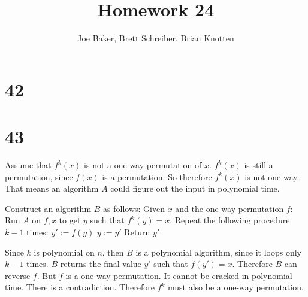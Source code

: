 \documentclass[letterpaper,notitlepage,twoside]{article}
\begin{document}
\title{Homework 24}
\author{Joe Baker, Brett Schreiber, Brian Knotten}
\maketitle
\section*{42}

\section*{43}
Assume that $f^k(x)$ is not a one-way permutation of $x$. $f^k(x)$ is still a permutation, since $f(x)$ is a permutation. So therefore $f^k(x)$ is not one-way. That means an algorithm $A$ could figure out the input in polynomial time.

Construct an algorithm $B$ as follows:
Given $x$ and the one-way permutation $f$:
\tab Run $A$ on $f, x$ to get $y$ such that $f^k(y) = x$.
\tab Repeat the following procedure $k - 1$ times:
\tab\tab $y' := f(y)$
\tab\tab $y := y'$
\tab Return $y'$

Since $k$ is polynomial on $n$, then $B$ is a polynomial algorithm, since it loops only $k - 1$ times. $B$ returns the final value $y'$ such that $f(y') = x$. Therefore $B$ can reverse $f$. But $f$ is a one way permutation. It cannot be cracked in polynomial time. There is a contradiction. Therefore $f^k$ must also be a one-way permutation.
\end{document}
